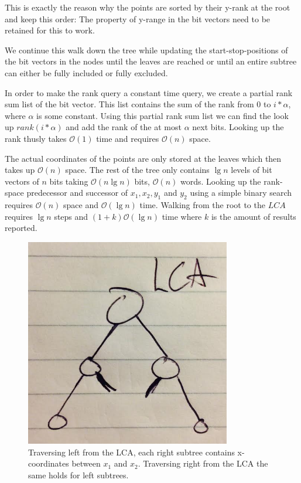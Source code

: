 This is exactly the reason why the points are sorted by their y-rank at the root and keep this order: The property of y-range in the bit vectors need to be retained for this to work. 

We continue this walk down the tree while updating the start-stop-positions of the bit vectors in the nodes until the leaves are reached or until an entire subtree can either be fully included or fully excluded. 

In order to make the rank query a constant time query, we create a partial rank sum list of the bit vector. This list contains the sum of the rank from $0$ to $i*\alpha$, where $\alpha$ is some constant. Using this partial rank sum list we can find the look up $rank(i*\alpha)$ and add the rank of the at most $\alpha$ next bits. Looking up the rank thusly takes $\mathcal{O}(1)$ time and requires $\mathcal{O}(n)$ space.

The actual coordinates of the points are only stored at the leaves which then takes up $\mathcal{O}(n)$ space. The rest of the tree only contains $\lg n$ levels of bit vectors of $n$ bits taking $\mathcal{O}(n \lg n)$ bits, $\mathcal{O}(n)$ words. Looking up the rank-space predecessor and successor of $x_1, x_2, y_1$ and $y_2$ using a simple binary search requires $\mathcal{O}(n)$ space and $\mathcal{O}(\lg n)$ time. Walking from the root to the $LCA$ requires $\lg n$ steps and $(1+k)\mathcal{O}(\lg n)$  time where $k$ is the amount of results reported.

\begin{figure}[p]
    \centering
    \includegraphics[width=0.8\textwidth]{pictures/LCA.png}
    \caption{Traversing left from the LCA, each right subtree contains x-coordinates between $x_1$ and $x_2$. Traversing right from the LCA the same holds for left subtrees.}
    \label{fig:LCA}
\end{figure}


